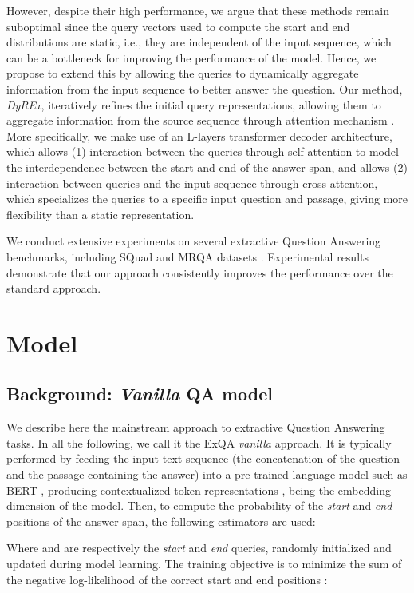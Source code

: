 \documentclass{article}
\begin{document}
However, despite their high performance, we argue that these methods remain suboptimal since the query vectors used to compute the start and end distributions are static, i.e., they are independent of the input sequence, which can be a bottleneck for improving the performance of the model. Hence, we propose to extend this by allowing the queries to dynamically aggregate information from the input sequence to better answer the question. Our method, \textit{DyREx}, iteratively refines the initial query representations, allowing them to aggregate information from the source sequence through attention mechanism \citep{attention_bahdanau, attention_is_all_u_need}. More specifically, we make use of an L-layers transformer decoder architecture, which allows (1) interaction between the queries through self-attention to model the interdependence between the start and end of the answer span, and allows (2) interaction between queries and the input sequence through cross-attention, which specializes the queries to a specific input question and passage, giving more flexibility than a static representation. 

We conduct extensive experiments on several extractive Question Answering benchmarks, including SQuad \citep{SQuAD} and MRQA datasets \citep{MRQA_data}. Experimental results demonstrate that our approach consistently improves the performance over the standard approach.


\section{Model} 
\subsection{Background: \textit{Vanilla} QA model \label{sec:van}}
We describe here the mainstream approach to extractive Question Answering tasks. In all the following, we call it the ExQA \textit{vanilla} approach. It is typically performed by feeding the input text sequence  (the concatenation of the question  and the passage  containing the answer) into a pre-trained language model such as BERT \citep{BERT}, producing contextualized token representations ,  being the embedding dimension of the model. Then, to compute the probability of the \textit{start} and \textit{end} positions of the answer span, the following estimators are used:


Where  and  are respectively the \textit{start} and \textit{end} queries, randomly initialized and updated during model learning. The training objective is to minimize the sum of the negative log-likelihood of the correct start and end positions : 
\end{document}
